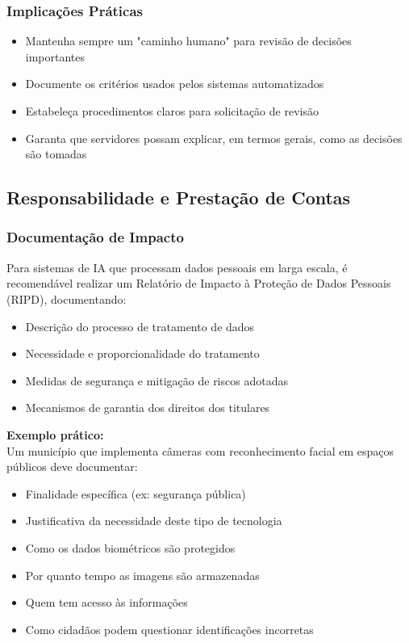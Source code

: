 \documentclass[12pt,a4paper]{article}
\begin{document}
\subsubsection{Implicações Práticas}
\begin{itemize}
    \item Mantenha sempre um "caminho humano" para revisão de decisões importantes
    \item Documente os critérios usados pelos sistemas automatizados
    \item Estabeleça procedimentos claros para solicitação de revisão
    \item Garanta que servidores possam explicar, em termos gerais, como as decisões são tomadas
\end{itemize}

\subsection{Responsabilidade e Prestação de Contas}

\subsubsection{Documentação de Impacto}
Para sistemas de IA que processam dados pessoais em larga escala, é recomendável realizar um Relatório de Impacto à Proteção de Dados Pessoais (RIPD), documentando:

\begin{itemize}
    \item Descrição do processo de tratamento de dados
    \item Necessidade e proporcionalidade do tratamento
    \item Medidas de segurança e mitigação de riscos adotadas
    \item Mecanismos de garantia dos direitos dos titulares
\end{itemize}

\begin{tcolorbox}[example]
\textbf{Exemplo prático:} \\
Um município que implementa câmeras com reconhecimento facial em espaços públicos deve documentar:
\begin{itemize}
    \item Finalidade específica (ex: segurança pública)
    \item Justificativa da necessidade deste tipo de tecnologia
    \item Como os dados biométricos são protegidos
    \item Por quanto tempo as imagens são armazenadas
    \item Quem tem acesso às informações
    \item Como cidadãos podem questionar identificações incorretas
\end{itemize}
\end{tcolorbox}
\end{document}

